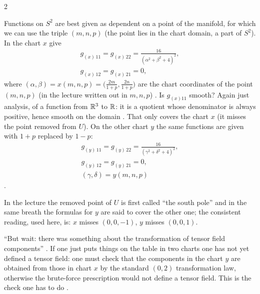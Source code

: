 \begin{paracol}{2}
\begin{example}\label{ex:sp-metric}
Functions on $S^2$ are best given as dependent on a point of the manifold, for which we can use the triple $(m,n,p)$ (the point lies in the
chart domain, a part of $S^2$). In the chart $x$ give
\begin{gather*}
  g_{(x)\,11}=g_{(x)\,22}=\frac{16}{(\alpha^2+\beta^2+4)^2},\\
  g_{(x)\,12}=g_{(x)\,21}=0,
\end{gather*}
where $(\alpha,\beta)=x(m,n,p)=\bigl(\tfrac{2m}{1+p},\tfrac{2n}{1+p}\bigr)$ are the chart coordinates of the point $(m,n,p)$ (in the lecture written out in $m,n,p$) . Is $g_{(x)11}$ smooth? Again just analysis, of
a function from $\mathbb{R}^3$ to $\mathbb{R}$: it is a quotient whose denominator is always positive, hence smooth on the domain .
That only covers the chart $x$ (it misses the point removed from $U$). On the other chart $y$ the same
functions are given with $1+p$ replaced by $1-p$:
\begin{gather*}
  g_{(y)\,11}=g_{(y)\,22}=\frac{16}{(\gamma^2+\delta^2+4)^2},\\ g_{(y)\,12}=g_{(y)\,21}=0,\\ (\gamma,\delta)=y(m,n,p)
\end{gather*}
.
\end{example}
\begin{coursenote}
In the lecture the removed point of $U$ is first called ``the south pole'' and in the same breath the formulas for $y$ are said to cover the
other one; the consistent reading, used here, is: $x$ misses $(0,0,-1)$, $y$ misses $(0,0,1)$.
\end{coursenote}

``But wait: there was something about the transformation of tensor field components'' . If one just puts things on the table in two charts
one has not yet defined a tensor field: one must check that the components in the chart $y$ are obtained from those in chart $x$ by the
standard $(0,2)$ transformation law, otherwise the brute-force prescription would not define a tensor field.
This is the check one has to do .


\end{paracol}
